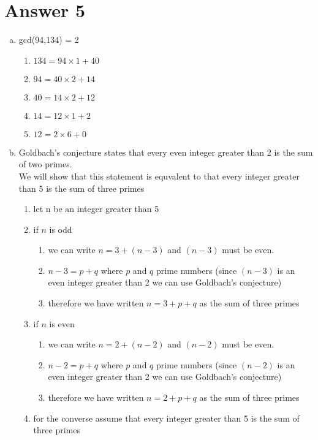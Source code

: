 \documentclass[12pt]{article}
\begin{document}
\section*{Answer 5}
\begin{enumerate}[a)]
    \item gcd(94,134) = 2
    \begin{enumerate}[1)]
        \item $134 = 94 \times 1 + 40 $
        \item $94 = 40 \times 2 + 14$
        \item $40 = 14\times2 + 12$
        \item $14 = 12\times1 + 2$
        \item $12= 2\times6 + 0$
    \end{enumerate}
    \item Goldbach's conjecture states that every even integer greater than 2 is the sum of two primes.\\
    We will show that this statement is equvalent to that every integer greater than 5 is the sum of three primes  
    \begin{enumerate}[1)]
        \item let n be an integer greater than 5
        \item if $n$ is odd
        \begin{enumerate}[2.1)]
            \item we can write $n = 3 + (n-3)$ and $(n-3)$ must be even.
            \item $n-3 = p + q$ where $p$ and $q$ prime numbers (since $(n-3)$ is an even integer greater than 2 we can use Goldbach's conjecture)
            \item therefore we have written $n = 3 + p + q$ as the sum of three primes
        \end{enumerate}
        \item if $n$ is even
        \begin{enumerate}[3.1)]
            \item we can write $n=2 + (n-2)$ and $(n-2)$ must be even.
            \item $n-2 = p + q$ where $p$ and $q$ prime numbers (since $(n-2)$ is an even integer greater than 2 we can use Goldbach's conjecture)
            \item therefore we have written $n = 2 + p + q$ as the sum of three primes
        \end{enumerate}
        \item for the converse assume that every integer greater than 5 is the sum of three primes

\end{enumerate}
\end{enumerate}
\end{document}
